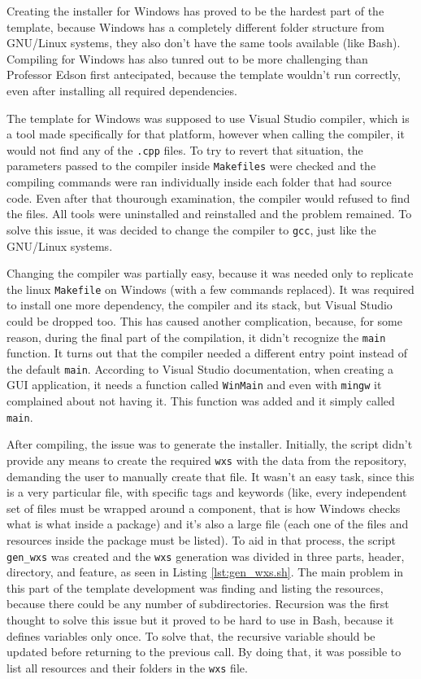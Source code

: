 Creating the installer for Windows has proved to be the hardest part of the template, because Windows has a completely different folder structure from GNU/Linux systems, they also don't have the same tools available (like Bash). Compiling for Windows has also tunred out to be more challenging than Professor Edson first antecipated, because the template wouldn't run correctly, even after installing all required dependencies.

The template for Windows was supposed to use Visual Studio compiler, which is a tool made specifically for that platform, however when calling the compiler, it would not find any of the \texttt{.cpp} files. To try to revert that situation, the parameters passed to the compiler inside \texttt{Makefiles} were checked and the compiling commands were ran individually inside each folder that had source code. Even after that thourough examination, the compiler would refused to find the files. All tools were uninstalled and reinstalled and the problem remained. To solve this issue, it was decided to change the compiler to \texttt{gcc}, just like the GNU/Linux systems.

Changing the compiler was partially easy, because it was needed only to replicate the linux \texttt{Makefile} on Windows (with a few commands replaced). It was required to install one more dependency, the compiler and its stack, but Visual Studio could be dropped too. This has caused another complication, because, for some reason, during the final part of the compilation, it didn't recognize the \texttt{main} function. It turns out that the compiler needed a different entry point instead of the default \texttt{main}. According to Visual Studio documentation, when creating a GUI application, it needs a function called \texttt{WinMain} \cite{visualstudio2017entrypoint} and even with \texttt{mingw} it complained about not having it. This function was added and it simply called \texttt{main}.

After compiling, the issue was to generate the installer. Initially, the script didn't provide any means to create the required \texttt{wxs} with the data from the repository, demanding the user to manually create that file. It wasn't an easy task, since this is a very particular file, with specific tags and keywords (like, every independent set of files must be wrapped around a component, that is how Windows checks what is what inside a package) and it's also a large file (each one of the files and resources inside the package must be listed). To aid in that process, the script \texttt{gen\_wxs} was created and the \texttt{wxs} generation was divided in three parts, header, directory, and feature, as seen in Listing \ref{lst:gen_wxs.sh}. The main problem in this part of the template development was finding and listing the resources, because there could be any number of subdirectories. Recursion was the first thought to solve this issue but it proved to be hard to use in Bash, because it defines variables only once. To solve that, the recursive variable should be updated before returning to the previous call. By doing that, it was possible to list all resources and their folders in the \texttt{wxs} file.


